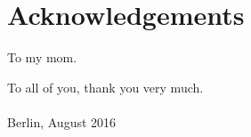 \documentclass[11pt, english, singlespacing, headsepline, ]{MastersDoctoralThesis}
\theoremstyle{definition}
\begin{document}


\chapter*{Acknowledgements}\pagestyle{empty}
To my mom.

To all of you, thank you very much.
\\
\\

Berlin, August 2016 



\pagestyle{empty} 
\tableofcontents%










\end{document}
